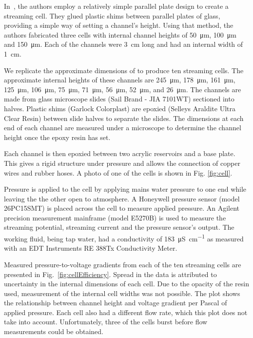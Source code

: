 \documentclass[10pt,final,journal]{IEEEtran}
\begin{document}
        In~\cite{Gu2000}, the authors employ a relatively simple parallel plate design to create a streaming cell.
        They glued plastic shims between parallel plates of glass, providing a simple way of setting a channel's height.
        Using that method, the authors fabricated three cells with internal channel heights of \SI{50}{\micro\metre}, \SI{100}{\micro\metre} and \SI{150}{\micro\metre}.
        Each of the channels were \SI{3}{\centi\metre} long and had an internal width of \SI{1}{\centi\metre}.

        We replicate the approximate dimensions of \cite{Gu2000} to produce ten streaming cells.
        The approximate internal heights of these channels are \SI{245}{\micro\metre}, \SI{178}{\micro\metre}, \SI{161}{\micro\metre}, \SI{125}{\micro\metre}, \SI{106}{\micro\metre}, \SI{75}{\micro\metre}, \SI{71}{\micro\metre}, \SI{56}{\micro\metre}, \SI{52}{\micro\metre}, and \SI{26}{\micro\metre}.
        The channels are made from glass microscope slides (Sail Brand - JIA 7101WT) sectioned into halves.
        Plastic shims (Garlock Colorplast) are epoxied (Selleys Araldite Ultra Clear Resin) between slide halves to separate the slides.
        The dimensions at each end of each channel are measured under a microscope to determine the channel height once the epoxy resin has set.

        Each channel is then epoxied between two acrylic reservoirs and a base plate.
        This gives a rigid structure under pressure and allows the connection of copper wires and rubber hoses.
        A photo of one of the cells is shown in Fig. \ref{fig:cell}.

        Pressure is applied to the cell by applying mains water pressure to one end while leaving the the other open to atmosphere.
        A Honeywell pressure sensor (model 26PC15SMT) is placed across the cell to measure applied pressure.
        An Agilent precision measurement mainframe (model E5270B) is used to measure the streaming potential, streaming current and the pressure sensor's output.
        The working fluid, being tap water, had a conductivity of \SI{183}{\micro\siemens\per\centi\metre} as measured with an EDT Instruments RE 388Tx Conductivity Meter.

        Measured pressure-to-voltage gradients from each of the ten streaming cells are presented in Fig.~\ref{fig:cellEfficiency}.
        Spread in the data is attributed to uncertainty in the internal dimensions of each cell.
        Due to the opacity of the resin used, measurement of the internal cell widths was not possible.
        The plot shows the relationship between channel height and voltage gradient per Pascal of applied pressure.
        Each cell also had a different flow rate, which this plot does not take into account.
        Unfortunately, three of the cells burst before flow measurements could be obtained.
\end{document}
